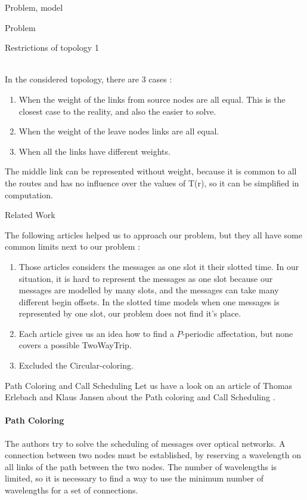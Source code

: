 \documentclass[a4paper,10pt]{report}
\begin{document}
\begin{chapter}{Problem, model}
\begin{section}{Problem}
\begin{subsection}{Restrictions of topology 1}
{{\begin{figure}[H]
\begin{center}
\end{center}
\end{figure}
}}\\


In the considered topology, there are 3 cases :
\begin{enumerate}
 \item When the weight of the links from source nodes are all equal. This is the closest case to the reality, and also the easier to solve.
 \item When the weight of the leave nodes links are all equal.
 \item When all the links have different weights.
\end{enumerate}

The middle link can be represented without weight, because it is common to all the routes and has no influence over the values of T(r), so it can be simplified in computation. 

\end{subsection}
\end{section}
\begin{section}{Related Work}

The following articles helped us to approach our problem, but they all have some common limits next to our problem :
\begin{enumerate}
 \item Those articles considers the messages as one slot it their slotted time. In our situation, it is hard to represent the messages as one slot because our messages are modelled by many slots, and the messages can take many different begin offsets. In the slotted time models when one messages is represented by one slot, our problem does not find it's place.
 \item Each article gives us an idea how to find a $P$-periodic affectation, but none covers a possible TwoWayTrip. 
 \item Excluded the Circular-coloring.
 
\end{enumerate}

\begin{subsection}{Path Coloring and Call Scheduling}
Let us have a look on an article of Thomas Erlebach and Klaus Jansen about the Path coloring and Call Scheduling \cite{erlebach2001complexity}.

\paragraph{Path Coloring}
The authors try to solve the scheduling of messages over optical networks. A connection between two nodes must be established, by reserving a wavelength on all links of the
path between the two nodes. The number of wavelengths is limited, so it is necessary to find a way to use the minimum number of wavelengths for a set 
of connections.


\end{subsection}
\end{section}
\end{chapter}
\end{document}
